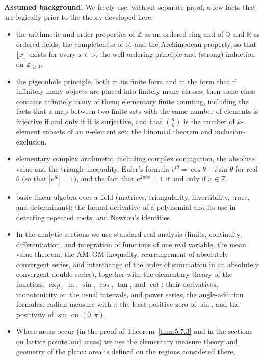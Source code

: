 \documentclass[11pt]{article}
\theoremstyle{ntstyle}
\begin{document}
\noindent \textbf{Assumed background.} We freely use, without separate proof, a few facts that are logically prior
to the theory developed here:
\begin{itemize}
\item the arithmetic and order properties of $\mathbb{Z}$ as an ordered ring and of $\mathbb{Q}$ and $\mathbb{R}$
as ordered fields, the completeness of $\mathbb{R}$, and the Archimedean property, so that $\lfloor x\rfloor$
exists for every $x\in\mathbb{R}$; the well-ordering principle and (strong) induction on $\mathbb{Z}_{\ge0}$.
\item the pigeonhole principle, both in its finite form and in the form that if infinitely many objects are placed
into finitely many classes, then some class contains infinitely many of them; elementary finite counting, including
the facts that a map between two finite sets with the same number of elements is injective if and only if it is
surjective, and that $\binom{n}{k}$ is the number of $k$-element subsets of an $n$-element set; the binomial
theorem and inclusion--exclusion.
\item elementary complex arithmetic, including complex conjugation, the absolute value and the triangle inequality,
Euler's formula $e^{i\theta}=\cos\theta+i\sin\theta$ for real $\theta$ (so that $|e^{i\theta}|=1$), and the fact
that $e^{2\pi i x}=1$ if and only if $x\in\mathbb{Z}$.
\item basic linear algebra over a field (matrices, triangularity, invertibility, trace, and determinant); the
formal derivative of a polynomial and its use in detecting repeated roots; and Newton's identities.
\item In the analytic sections we use standard real analysis (limits, continuity, differentiation, and integration
of functions of one real variable, the mean value theorem, the AM--GM inequality, rearrangement of absolutely
convergent series, and interchange of the order of summation in an absolutely convergent double series), together
with the elementary theory of the functions $\exp$, $\ln$, $\sin$, $\cos$, $\tan$, and $\cot$: their derivatives,
monotonicity on the usual intervals, and power series, the angle-addition formulas, radian measure with $\pi$ the
least positive zero of $\sin$, and the positivity of $\sin$ on $(0,\pi)$.
\item Where areas occur (in the proof of Theorem~\ref{thm:5.7.3} and in the sections on lattice points and areas)
we use the elementary measure theory and geometry of the plane: area is defined on the regions considered there,

\end{itemize}
\end{document}
